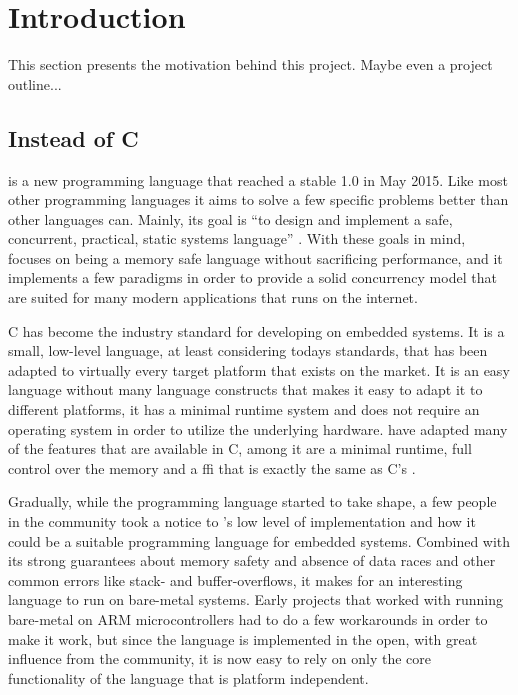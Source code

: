 
\chapter{Introduction}
\label{chap:intro}

This section presents the motivation behind this project.
Maybe even a project outline...

\section{\rust Instead of C} %
\label{sec:intro:rust_as_replacement_to_c}

\rust is a new programming language that reached a stable 1.0 in May 2015.
Like most other programming languages it aims to solve a few specific problems better than other languages can.
Mainly, its goal is ``to design and implement a safe, concurrent, practical, static systems language'' \cite{web:rust_faq}.
With these goals in mind, {\rust} focuses on being a memory safe language without sacrificing performance, and it implements a few paradigms in order to provide a solid concurrency model that are suited for many modern applications that runs on the internet.

C has become the industry standard for developing on embedded systems.
It is a small, low-level language, at least considering todays standards, that has been adapted to virtually every target platform that exists on the market.
It is an easy language without many language constructs that makes it easy to adapt it to different platforms, it has a minimal runtime system and does not require an operating system in order to utilize the underlying hardware.
\rust have adapted many of the features that are available in C, among it are a minimal runtime, full control over the memory and a \gls{ffi} that is exactly the same as C's \cite{web:rust_run_once_run_everywhere}.

Gradually, while the {\rust} programming language started to take shape, a few people in the community took a notice to {\rust}'s low level of implementation and how it could be a suitable programming language for embedded systems.
Combined with its strong guarantees about memory safety and absence of data races and other common errors like stack- and buffer-overflows, it makes for an interesting language to run on bare-metal systems.
Early projects that worked with running {\rust} bare-metal on ARM microcontrollers had to do a few workarounds in order to make it work, but since the language is implemented in the open, with great influence from the community, it is now easy to rely on only the core functionality of the language that is platform independent.

